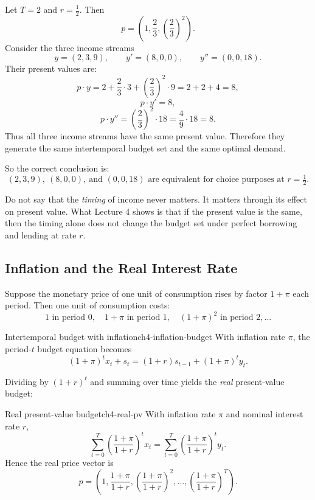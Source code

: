 \begin{examplebox}[title={Worked Example: different income timings with the same present value}]
Let $T=2$ and $r=\tfrac12$. Then
\[
p=\left(1,\frac{2}{3},\left(\frac{2}{3}\right)^2\right).
\]
Consider the three income streams
\[
y=(2,3,9), \qquad y'=(8,0,0), \qquad y''=(0,0,18).
\]
Their present values are:
\[
p\cdot y = 2+\frac{2}{3}\cdot 3 + \left(\frac{2}{3}\right)^2\cdot 9 = 2+2+4=8,
\]
\[
p\cdot y' = 8,
\]
\[
p\cdot y'' = \left(\frac{2}{3}\right)^2\cdot 18 = \frac{4}{9}\cdot 18 = 8.
\]
Thus all three income streams have the same present value. Therefore they generate the same intertemporal budget set and the same optimal demand.

So the correct conclusion is:
\[
\boxed{
(2,3,9),\ (8,0,0),\ \text{and } (0,0,18)
\text{ are equivalent for choice purposes at } r=\tfrac12.
}
\]
\end{examplebox}

\begin{commonmistake}
Do not say that the \emph{timing} of income never matters. It matters through its effect on present value. What Lecture 4 shows is that if the present value is the same, then the timing alone does not change the budget set under perfect borrowing and lending at rate $r$.
\end{commonmistake}

\subsection{Inflation and the Real Interest Rate}

Suppose the monetary price of one unit of consumption rises by factor $1+\pi$ each period. Then one unit of consumption costs:
\[
1 \text{ in period 0}, \quad 1+\pi \text{ in period 1}, \quad (1+\pi)^2 \text{ in period 2}, \dots
\]

\begin{definition}{Intertemporal budget with inflation}{ch4-inflation-budget}
With inflation rate $\pi$, the period-$t$ budget equation becomes
\[
(1+\pi)^t x_t + s_t = (1+r)s_{t-1} + (1+\pi)^t y_t.
\]
\end{definition}

Dividing by $(1+r)^t$ and summing over time yields the \emph{real} present-value budget:

\begin{theorem}{Real present-value budget}{ch4-real-pv}
With inflation rate $\pi$ and nominal interest rate $r$,
\[
\sum_{t=0}^{T}\left(\frac{1+\pi}{1+r}\right)^t x_t
=
\sum_{t=0}^{T}\left(\frac{1+\pi}{1+r}\right)^t y_t.
\]
Hence the real price vector is
\[
p=\left(1,\frac{1+\pi}{1+r},\left(\frac{1+\pi}{1+r}\right)^2,\dots,\left(\frac{1+\pi}{1+r}\right)^T\right).
\]
\end{theorem}

